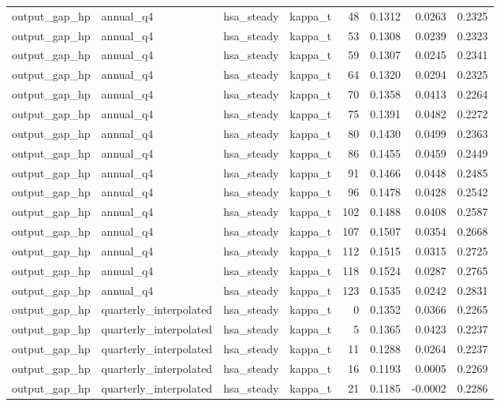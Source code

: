 \begin{tabular}{llllrrrr}
output\_gap\_hp & annual\_q4 & hsa\_steady & kappa\_t & 48 & 0.1312 & 0.0263 & 0.2325 \\
output\_gap\_hp & annual\_q4 & hsa\_steady & kappa\_t & 53 & 0.1308 & 0.0239 & 0.2323 \\
output\_gap\_hp & annual\_q4 & hsa\_steady & kappa\_t & 59 & 0.1307 & 0.0245 & 0.2341 \\
output\_gap\_hp & annual\_q4 & hsa\_steady & kappa\_t & 64 & 0.1320 & 0.0294 & 0.2325 \\
output\_gap\_hp & annual\_q4 & hsa\_steady & kappa\_t & 70 & 0.1358 & 0.0413 & 0.2264 \\
output\_gap\_hp & annual\_q4 & hsa\_steady & kappa\_t & 75 & 0.1391 & 0.0482 & 0.2272 \\
output\_gap\_hp & annual\_q4 & hsa\_steady & kappa\_t & 80 & 0.1430 & 0.0499 & 0.2363 \\
output\_gap\_hp & annual\_q4 & hsa\_steady & kappa\_t & 86 & 0.1455 & 0.0459 & 0.2449 \\
output\_gap\_hp & annual\_q4 & hsa\_steady & kappa\_t & 91 & 0.1466 & 0.0448 & 0.2485 \\
output\_gap\_hp & annual\_q4 & hsa\_steady & kappa\_t & 96 & 0.1478 & 0.0428 & 0.2542 \\
output\_gap\_hp & annual\_q4 & hsa\_steady & kappa\_t & 102 & 0.1488 & 0.0408 & 0.2587 \\
output\_gap\_hp & annual\_q4 & hsa\_steady & kappa\_t & 107 & 0.1507 & 0.0354 & 0.2668 \\
output\_gap\_hp & annual\_q4 & hsa\_steady & kappa\_t & 112 & 0.1515 & 0.0315 & 0.2725 \\
output\_gap\_hp & annual\_q4 & hsa\_steady & kappa\_t & 118 & 0.1524 & 0.0287 & 0.2765 \\
output\_gap\_hp & annual\_q4 & hsa\_steady & kappa\_t & 123 & 0.1535 & 0.0242 & 0.2831 \\
output\_gap\_hp & quarterly\_interpolated & hsa\_steady & kappa\_t & 0 & 0.1352 & 0.0366 & 0.2265 \\
output\_gap\_hp & quarterly\_interpolated & hsa\_steady & kappa\_t & 5 & 0.1365 & 0.0423 & 0.2237 \\
output\_gap\_hp & quarterly\_interpolated & hsa\_steady & kappa\_t & 11 & 0.1288 & 0.0264 & 0.2237 \\
output\_gap\_hp & quarterly\_interpolated & hsa\_steady & kappa\_t & 16 & 0.1193 & 0.0005 & 0.2269 \\
output\_gap\_hp & quarterly\_interpolated & hsa\_steady & kappa\_t & 21 & 0.1185 & -0.0002 & 0.2286 \\

\end{tabular}
